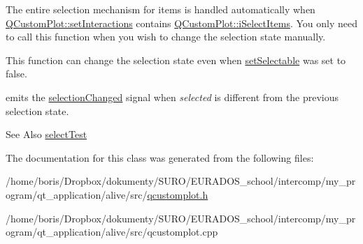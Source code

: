 The entire selection mechanism for items is handled automatically when \hyperlink{classQCustomPlot_add9cc886ff5257f64fb4117cf6c135fe}{Q\-Custom\-Plot\-::set\-Interactions} contains \hyperlink{classQCustomPlot_acc82d021129b61e550e36747d2e76d3aa2f1c34708a97bc30cc14684fa6cb844d}{Q\-Custom\-Plot\-::i\-Select\-Items}. You only need to call this function when you wish to change the selection state manually.

This function can change the selection state even when \hyperlink{classQCPAbstractItem_a8a8e32a55bc478b849756a78c2d87fd2}{set\-Selectable} was set to false.

emits the \hyperlink{classQCPAbstractItem_aa5cffb034fc65dbb91c77e02c1c14251}{selection\-Changed} signal when {\itshape selected} is different from the previous selection state.

\begin{DoxySeeAlso}{See Also}
\hyperlink{classQCPAbstractItem_a2e19e88f67f4ba9c13b7e33bd447c075}{select\-Test} 
\end{DoxySeeAlso}


The documentation for this class was generated from the following files\-:\begin{DoxyCompactItemize}
\item 
/home/boris/\-Dropbox/dokumenty/\-S\-U\-R\-O/\-E\-U\-R\-A\-D\-O\-S\-\_\-school/intercomp/my\-\_\-program/qt\-\_\-application/alive/src/\hyperlink{qcustomplot_8h}{qcustomplot.\-h}\item 
/home/boris/\-Dropbox/dokumenty/\-S\-U\-R\-O/\-E\-U\-R\-A\-D\-O\-S\-\_\-school/intercomp/my\-\_\-program/qt\-\_\-application/alive/src/qcustomplot.\-cpp\end{DoxyCompactItemize}
